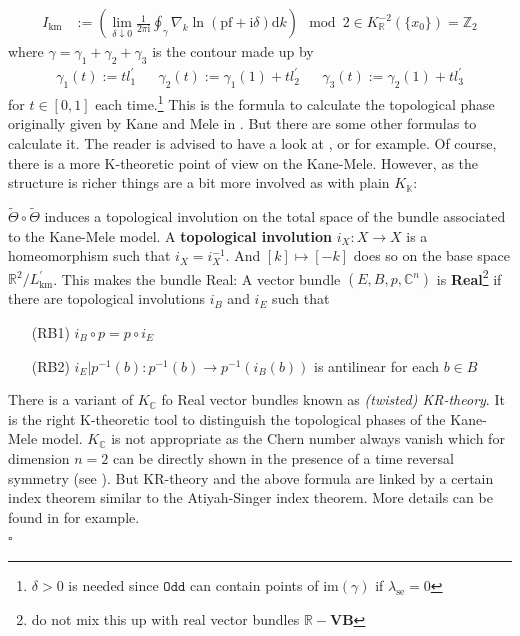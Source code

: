 \begin{align*}
  I_{\textrm{km}}
  &:=
  \left(
    \lim_{\delta \downarrow 0}
    \frac{1}{2\pi\mathrm{i}}
    \oint_{\gamma}
    \nabla_{k}
    \ln(\mathrm{pf} + \mathrm{i}\delta)
    \mathrm{d}k
  \right)
  \mod
  2
  \in
  K_{\mathbb{R}}^{-2}(\lbrace x_{0} \rbrace)
  =
  \mathbb{Z}_{2}
\end{align*}
where $\gamma = \gamma_{1} + \gamma_{2} + \gamma_{3}$ is the contour made up by
\begin{align*}
  \gamma_{1}(t)
  :=
  tl_{1}^{\prime}
  &&
  \gamma_{2}(t)
  :=
  \gamma_{1}(1)
  +
  tl_{2}^{\prime}
  &&
  \gamma_{3}(t)
  :=
  \gamma_{2}(1)
  +
  tl_{3}^{\prime}
\end{align*}
for $t \in [0,1]$ each time.\footnote{$\delta > 0$ is needed since $\mathtt{Odd}$ can contain points of $\mathrm{im}(\gamma)$ if $\lambda_{\textrm{se}} = 0$} This is the formula to calculate the topological phase originally given by Kane and Mele in \cite{04d6b664}. But there are some other formulas to calculate it. The reader is advised to have a look at \cite{fa76af21}, \cite{f6db8935} or \cite{6ab9663f} for example. Of course, there is a more K-theoretic point of view on the Kane-Mele. However, as the structure is richer things are a bit more involved as with plain $K_{\mathbb{K}}$:
\\
\begin{rem}
\label{rem:krtheory}
  $\tilde{\Theta} \circ \tilde{\Theta}$ induces a topological involution on the total space of the bundle associated to the Kane-Mele model. A \textbf{topological involution} $i_{X} \colon X \to X$ is a homeomorphism such that $i_{X} = i_{X}^{-1}$. And $[k] \mapsto [-k]$ does so on the base space $\mathbb{R}^{2}/L_{\textrm{km}}^{\prime}$. This makes the bundle {\glqq}Real{\grqq}: A vector bundle $(E,B,p,\mathbb{C}^{n})$ is \textbf{Real}\footnote{do not mix this up with real vector bundles $\mathbb{R}-\mathbf{VB}$} if there are topological involutions $i_{B}$ and $i_{E}$ such that
\begin{enumerate}
\item[(RB1)]
$i_{B} \circ p = p \circ i_{E}$
\item[(RB2)]
$i_{E} \vert p^{-1}(b) \colon p^{-1}(b) \to p^{-1}(i_{B}(b))$ is antilinear for each $b \in B$
\end{enumerate}
  There is a variant of $K_{\mathbb{C}}$ fo Real vector bundles known as \textit{(twisted) KR-theory}. It is the right K-theoretic tool to distinguish the topological phases of the Kane-Mele model. $K_{\mathbb{C}}$ is not appropriate as the Chern number always vanish which for dimension $n = 2$ can be directly shown in the presence of a time reversal symmetry (see \cite{d02f3620}). But KR-theory and the above formula are linked by a certain index theorem similar to the Atiyah-Singer index theorem. More details can be found in \cite{fa76af21} for example.
\\
\phantom{proven}
\hfill
$\square$
\end{rem}
